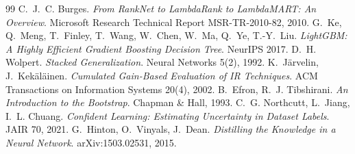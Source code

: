 \documentclass[12pt,a4paper]{report}
\begin{document}
\begin{thebibliography}{99}
 C.~J.~C. Burges. \emph{From RankNet to LambdaRank to LambdaMART: An Overview}. Microsoft Research Technical Report MSR-TR-2010-82, 2010.
 G.~Ke, Q.~Meng, T.~Finley, T.~Wang, W.~Chen, W.~Ma, Q.~Ye, T.-Y.~Liu. \emph{LightGBM: A Highly Efficient Gradient Boosting Decision Tree}. NeurIPS 2017.
 D.~H. Wolpert. \emph{Stacked Generalization}. Neural Networks 5(2), 1992.
 K.~J\"arvelin, J.~Kek\"al\"ainen. \emph{Cumulated Gain-Based Evaluation of IR Techniques}. ACM Transactions on Information Systems 20(4), 2002.
 B.~Efron, R.~J. Tibshirani. \emph{An Introduction to the Bootstrap}. Chapman \& Hall, 1993.
 C.~G. Northcutt, L.~Jiang, I.~L. Chuang. \emph{Confident Learning: Estimating Uncertainty in Dataset Labels}. JAIR 70, 2021.
 G.~Hinton, O.~Vinyals, J.~Dean. \emph{Distilling the Knowledge in a Neural Network}. arXiv:1503.02531, 2015.
\end{thebibliography}
\end{document}
